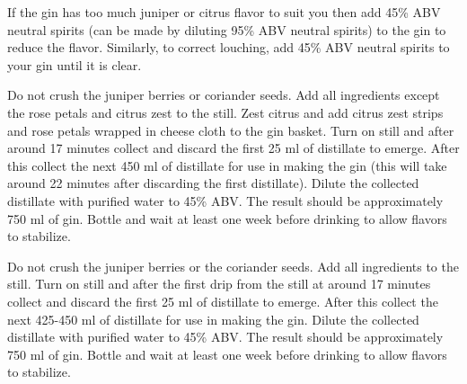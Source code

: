 \documentclass[letterpaper]{recipePMG}
\begin{document}
If the gin has too much juniper or citrus flavor to suit you then 
add 45\% ABV neutral spirits (can be made by diluting 95\% ABV neutral spirits) to the gin to reduce the flavor. Similarly, to correct louching, add 45\% ABV neutral spirits to your gin until it is clear.

\newpage
{}
\label{GinNumber11}



Do not crush the juniper berries or coriander seeds. Add all ingredients except the rose petals and citrus zest to the still.  Zest citrus and add citrus zest strips and rose petals wrapped in cheese cloth to the gin basket.  Turn on still and after around 17 minutes collect and discard the first 25 ml of distillate to emerge. After this collect the next 450 ml of distillate for use in making the gin (this will take around 22 minutes after discarding the first distillate). Dilute the collected distillate with purified water to 45\% ABV. The result should be approximately 750 ml of gin. Bottle and wait at least one week before drinking to allow flavors to stabilize.


\newpage

\label{MangoMulberryGin}


Do not crush the juniper berries or the coriander seeds. Add all ingredients to the still.  Turn on still and after the first drip from the still at around 17 minutes collect and discard the first 25 ml of distillate to emerge. After this collect the next 425-450 ml of distillate for use in making the gin. Dilute the collected distillate with purified water to 45\% ABV. The result should be approximately 750 ml of gin. Bottle and wait at least one week before drinking to allow flavors to stabilize.
\end{document}
